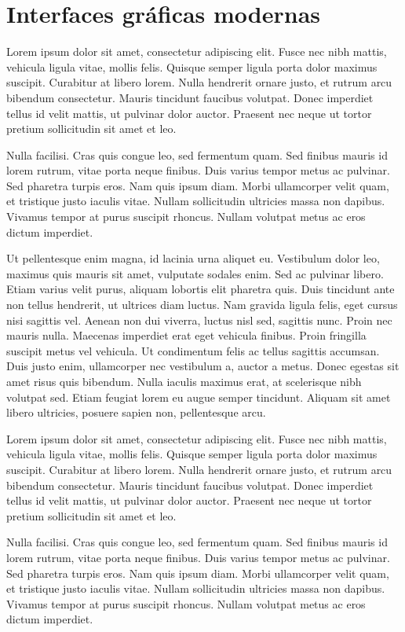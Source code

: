 \section{Interfaces gráficas modernas}

Lorem ipsum dolor sit amet, consectetur adipiscing elit. Fusce nec nibh mattis, vehicula ligula vitae, mollis felis. Quisque semper ligula porta dolor maximus suscipit. Curabitur at libero lorem. Nulla hendrerit ornare justo, et rutrum arcu bibendum consectetur. Mauris tincidunt faucibus volutpat. Donec imperdiet tellus id velit mattis, ut pulvinar dolor auctor. Praesent nec neque ut tortor pretium sollicitudin sit amet et leo.

Nulla facilisi. Cras quis congue leo, sed fermentum quam. Sed finibus mauris id lorem rutrum, vitae porta neque finibus. Duis varius tempor metus ac pulvinar. Sed pharetra turpis eros. Nam quis ipsum diam. Morbi ullamcorper velit quam, et tristique justo iaculis vitae. Nullam sollicitudin ultricies massa non dapibus. Vivamus tempor at purus suscipit rhoncus. Nullam volutpat metus ac eros dictum imperdiet.

Ut pellentesque enim magna, id lacinia urna aliquet eu. Vestibulum dolor leo, maximus quis mauris sit amet, vulputate sodales enim. Sed ac pulvinar libero. Etiam varius velit purus, aliquam lobortis elit pharetra quis. Duis tincidunt ante non tellus hendrerit, ut ultrices diam luctus. Nam gravida ligula felis, eget cursus nisi sagittis vel. Aenean non dui viverra, luctus nisl sed, sagittis nunc. Proin nec mauris nulla. Maecenas imperdiet erat eget vehicula finibus. Proin fringilla suscipit metus vel vehicula. Ut condimentum felis ac tellus sagittis accumsan. Duis justo enim, ullamcorper nec vestibulum a, auctor a metus. Donec egestas sit amet risus quis bibendum. Nulla iaculis maximus erat, at scelerisque nibh volutpat sed. Etiam feugiat lorem eu augue semper tincidunt. Aliquam sit amet libero ultricies, posuere sapien non, pellentesque arcu.

Lorem ipsum dolor sit amet, consectetur adipiscing elit. Fusce nec nibh mattis, vehicula ligula vitae, mollis felis. Quisque semper ligula porta dolor maximus suscipit. Curabitur at libero lorem. Nulla hendrerit ornare justo, et rutrum arcu bibendum consectetur. Mauris tincidunt faucibus volutpat. Donec imperdiet tellus id velit mattis, ut pulvinar dolor auctor. Praesent nec neque ut tortor pretium sollicitudin sit amet et leo.

Nulla facilisi. Cras quis congue leo, sed fermentum quam. Sed finibus mauris id lorem rutrum, vitae porta neque finibus. Duis varius tempor metus ac pulvinar. Sed pharetra turpis eros. Nam quis ipsum diam. Morbi ullamcorper velit quam, et tristique justo iaculis vitae. Nullam sollicitudin ultricies massa non dapibus. Vivamus tempor at purus suscipit rhoncus. Nullam volutpat metus ac eros dictum imperdiet.

